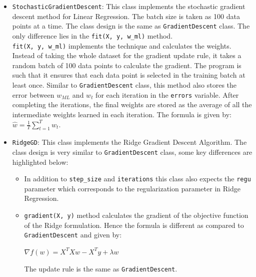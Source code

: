\documentclass[a4paper]{article}
\begin{document}
\begin{itemize}
\begin{itemize}
        \item \verb|predict(X)| method calculates the predictions similar to the \verb|OLS| class. The predictions are calculated as $X\hat{w}$, where $\hat{w}$ is the weight vector obtained after running the gradient descent algorithm.
    \end{itemize}

    \item \verb|StochasticGradientDescent|: This class implements the stochastic gradient descent method for Linear Regression. The batch size is taken as 100 data points at a time. The class design is the same as \verb|GradientDescent| class. The only difference lies in the \verb|fit(X, y, w_ml)| method. \\
    \verb|fit(X, y, w_ml)| implements the technique and calculates the weights. Instead of taking the whole dataset for the gradient update rule, it takes a random batch of 100 data points to calculate the gradient. The program is such that it ensures that each data point is selected in the training batch at least once. Similar to \verb|GradientDescent| class, this method also stores the error between $w_{ML}$ and $w_t$ for each iteration in the \verb|errors| variable. After completing the iterations, the final weights are stored as the average of all the intermediate weights learned in each iteration. The formula is given by: $\hat{w}=\displaystyle \frac{1}{T} \sum_{t=1}^T w_t$.

    \item \verb|RidgeGD|: This class implements the Ridge Gradient Descent Algorithm. The class design is very similar to \verb|GradientDescent| class, some key differences are highlighted below:
    \begin{itemize}
        \item In addition to \verb|step_size| and \verb|iterations| this class also expects the \verb|regu| parameter which corresponds to the regularization parameter in Ridge Regression.
        
        \item \verb|gradient(X, y)| method calculates the gradient of the objective function of the Ridge formulation. Hence the formula is different as compared to \verb|GradientDescent| and given by:
        \begin{center}
            $\nabla f(w)= X^T X w - X^T y + \lambda w$
        \end{center}
        The update rule is the same as \verb|GradientDescent|.
    \end{itemize}


\end{itemize}
\end{document}
